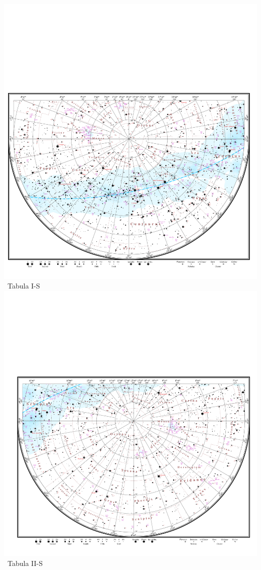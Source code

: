 \documentclass[10pt,landscape,oneside]{article}
\begin{document}
\begin{center}
\noindent\includegraphics[height=\textheight,trim= 0.0cm -0.5cm 0.0cm 13.85cm,clip]{TabulaVIII.pdf}\\[-1.025\textheight]\hfill\large~Tabula I-S\hspace{25mm}
\clearpage
%
\noindent\includegraphics[height=\textheight,trim= 0.0cm -0.5cm 0.0cm 13.85cm,clip]{TabulaVII.pdf}\\[-1.025\textheight]\hfill\large~Tabula II-S\hspace{18mm}

\end{center}
\end{document}
